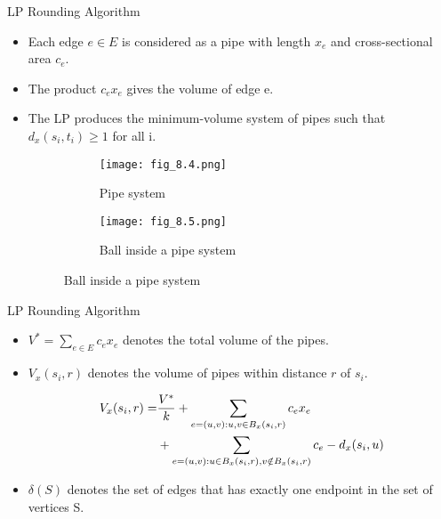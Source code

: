\documentclass{beamer}
\begin{document}
\begin{frame}{LP Rounding Algorithm}

\begin{itemize}
    \item Each edge $e \in E$ is considered as a pipe with length $x_e$ and cross-sectional area $c_e$.

    \item The product $c_e x_e$ gives the volume of edge e.

    \item The LP produces the minimum-volume system of pipes such that $d_x(s_i , t_i ) \geq 1$ for all i. 

    \begin{figure}
        \centering
        \begin{subfigure}[b]{0.45\textwidth}
            \texttt{[image: fig\_8.4.png]}
            \caption{Pipe system}
            \label{fig:subfig1}
        \end{subfigure}
        \hfill
        \begin{subfigure}[b]{0.45\textwidth}
            \texttt{[image: fig\_8.5.png]}
            \caption{Ball inside a pipe system}
            \label{fig:subfig2}
        \end{subfigure}
        \label{fig:main}
    \end{figure}


\end{itemize}
    
\end{frame}


\begin{frame}{LP Rounding Algorithm}

\begin{itemize}
  \item $ V^* = \sum_{e \in E } c_e x_e$ denotes the total volume of the pipes.

  \item $ V_x(s_i, r) $ denotes the volume of pipes within distance $r$ of $s_i$. 



\begin{align*}
    V_x(s_i, r) = & \frac{V^*}{k} + \sum_{e = (u,v) : u,v \in B_x(s_i, r)}{c_ex_e} \\
    & + \sum_{e = (u,v) : u \in B_x(s_i, r), v \notin B_x(s_i, r)}{c_e - d_x(s_i, u)} \notag \newline
\end{align*}

\pause
\item $\delta(S)$  denotes the set of edges that has exactly one endpoint in the set of vertices S.

\end{itemize}
\end{frame}
\end{document}
